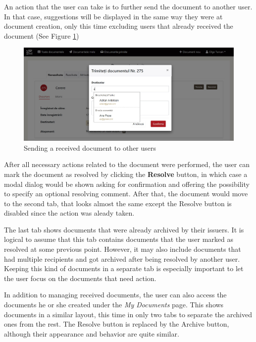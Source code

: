 An action that the user can take is to further send the document to another user. In that case, suggestions will be displayed in the same way they were at document creation, only this time excluding users that already received the document (See Figure \ref{resendModal})

\begin{figure}[ht]
    \centering
    \includegraphics[width=5.5in]{images/app/received_resend_modal}
    \caption{Sending a received document to other users}
    \label{resendModal}
\end{figure}

After all necessary actions related to the document were performed, the user can mark the document as resolved by clicking the \textbf{Resolve} button, in which case a modal dialog would be shown asking for confirmation and offering the possibility to specify an optional resolving comment. After that, the document would move to the second tab, that looks almost the same except the Resolve button is disabled since the action was aleady taken.

The last tab shows documents that were already archived by their issuers. It is logical to assume that this tab contains documents that the user marked as resolved at some previous point. However, it may also include documents that had multiple recipients and got archived after being resolved by another user. Keeping this kind of documents in a separate tab is especially important to let the user focus on the documents that need action.

In addition to managing received documents, the user can also access the documents he or she created under the \textit{My Documents} page. This shows documents in a similar layout, this time in only two tabs to separate the archived ones from the rest. The Resolve button is replaced by the Archive button, although their appearance and behavior are quite similar.

